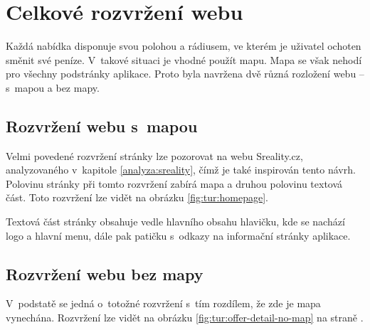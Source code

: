 \section{Celkové rozvržení webu}

\label{nur:layout}

Každá nabídka disponuje svou polohou a rádiusem, ve kterém je uživatel ochoten směnit své peníze. V~takové situaci je vhodné použít mapu. Mapa se však nehodí pro všechny podstránky aplikace. Proto byla navržena dvě různá rozložení webu -- s~mapou a bez mapy.

\subsection{Rozvržení webu s~mapou}
Velmi povedené rozvržení stránky lze pozorovat na webu Sreality.cz, analyzovaného v~kapitole \ref{analyza:sreality}, čímž je také inspirován tento návrh. Polovinu stránky při tomto rozvržení zabírá mapa a druhou polovinu textová část. Toto rozvržení lze vidět na obrázku \ref{fig:tur:homepage}.

Textová část stránky obsahuje vedle hlavního obsahu hlavičku, kde se nachází logo a hlavní menu, dále pak patičku s~odkazy na informační stránky aplikace.

\subsection{Rozvržení webu bez mapy}
V~podstatě se jedná o~totožné rozvržení s~tím rozdílem, že zde je mapa vynechána. Rozvržení lze vidět na obrázku \ref{fig:tur:offer-detail-no-map} na straně \pageref{fig:tur:offer-detail-no-map}.
